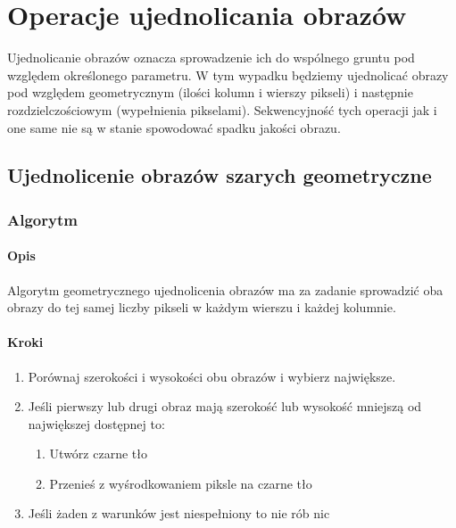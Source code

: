 \documentclass[a4paper,12pt]{book}
\begin{document}
\chapter{Operacje ujednolicania obrazów}
Ujednolicanie obrazów oznacza sprowadzenie ich do wspólnego gruntu pod względem określonego parametru. W tym wypadku będziemy ujednolicać obrazy pod względem geometrycznym (ilości kolumn i wierszy pikseli) i następnie rozdzielczościowym (wypełnienia pikselami). Sekwencyjność tych operacji jak i one same nie są w stanie spowodować spadku jakości obrazu. 
\section{Ujednolicenie obrazów szarych geometryczne}
\subsection*{Algorytm}
\subsubsection*{Opis}
Algorytm geometrycznego ujednolicenia obrazów ma za zadanie sprowadzić oba obrazy do tej samej liczby pikseli w każdym wierszu i każdej kolumnie. 

\subsubsection*{Kroki}
\begin{enumerate}
	\item Porównaj szerokości i wysokości obu obrazów i wybierz największe. 
	\item Jeśli pierwszy lub drugi obraz mają szerokość lub wysokość mniejszą od największej dostępnej to:
	\begin{enumerate}
		\item Utwórz czarne tło
		\item Przenieś z wyśrodkowaniem piksle na czarne tło
	\end{enumerate}
	\item Jeśli żaden z warunków jest niespełniony to nie rób nic
\end{enumerate}
\end{document}
